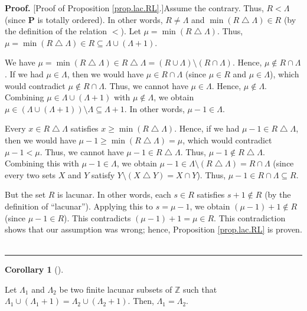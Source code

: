 \documentclass[numbers=enddot,12pt,final,onecolumn,notitlepage]{scrartcl}%
\theoremstyle{definition}
\newtheorem{coro}[theo]{Corollary}
\newenvironment{corollary}[1][]
{\begin{coro}[#1]\begin{leftbar}}
{\end{leftbar}\end{coro}}
\newenvironment{proof}[1][Proof]{\noindent\textbf{#1.} }{\ \rule{0.5em}{0.5em}}
\begin{document}
\begin{proof}
[Proof of Proposition \ref{prop.lac.RL}.]Assume the contrary. Thus,
$R<\Lambda$ (since $\mathbf{P}$ is totally ordered). In other words,
$R\neq\Lambda$ and $\min\left(  R\bigtriangleup\Lambda\right)  \in R$ (by the
definition of the relation $<$). Let $\mu=\min\left(  R\bigtriangleup
\Lambda\right)  $. Thus, $\mu=\min\left(  R\bigtriangleup\Lambda\right)  \in
R\subseteq\Lambda\cup\left(  \Lambda+1\right)  $.

We have $\mu=\min\left(  R\bigtriangleup\Lambda\right)  \in R\bigtriangleup
\Lambda=\left(  R\cup\Lambda\right)  \setminus\left(  R\cap\Lambda\right)  $.
Hence, $\mu\notin R\cap\Lambda$. If we had $\mu\in\Lambda$, then we would have
$\mu\in R\cap\Lambda$ (since $\mu\in R$ and $\mu\in\Lambda$), which would
contradict $\mu\notin R\cap\Lambda$. Thus, we cannot have $\mu\in\Lambda$.
Hence, $\mu\notin\Lambda$. Combining $\mu\in\Lambda\cup\left(  \Lambda
+1\right)  $ with $\mu\notin\Lambda$, we obtain $\mu\in\left(  \Lambda
\cup\left(  \Lambda+1\right)  \right)  \setminus\Lambda\subseteq\Lambda+1$. In
other words, $\mu-1\in\Lambda$.

Every $x\in R\bigtriangleup\Lambda$ satisfies $x\geq\min\left(
R\bigtriangleup\Lambda\right)  $. Hence, if we had $\mu-1\in R\bigtriangleup
\Lambda$, then we would have $\mu-1\geq\min\left(  R\bigtriangleup
\Lambda\right)  =\mu$, which would contradict $\mu-1<\mu$. Thus, we cannot
have $\mu-1\in R\bigtriangleup\Lambda$. Thus, $\mu-1\notin R\bigtriangleup
\Lambda$. Combining this with $\mu-1\in\Lambda$, we obtain $\mu-1\in
\Lambda\setminus\left(  R\bigtriangleup\Lambda\right)  =R\cap\Lambda$ (since
every two sets $X$ and $Y$ satisfy $Y\setminus\left(  X\bigtriangleup
Y\right)  =X\cap Y$). Thus, $\mu-1\in R\cap\Lambda\subseteq R$.

But the set $R$ is lacunar. In other words, each $s\in R$ satisfies $s+1\notin
R$ (by the definition of \textquotedblleft lacunar\textquotedblright).
Applying this to $s=\mu-1$, we obtain $\left(  \mu-1\right)  +1\notin R$
(since $\mu-1\in R$). This contradicts $\left(  \mu-1\right)  +1=\mu\in R$.
This contradiction shows that our assumption was wrong; hence, Proposition
\ref{prop.lac.RL} is proven.
\end{proof}

\begin{corollary}
\label{cor.lac.L=L}Let $\Lambda_{1}$ and $\Lambda_{2}$ be two finite lacunar
subsets of $\mathbb{Z}$ such that $\Lambda_{1}\cup\left(  \Lambda
_{1}+1\right)  =\Lambda_{2}\cup\left(  \Lambda_{2}+1\right)  $. Then,
$\Lambda_{1}=\Lambda_{2}$.
\end{corollary}
\end{document}
